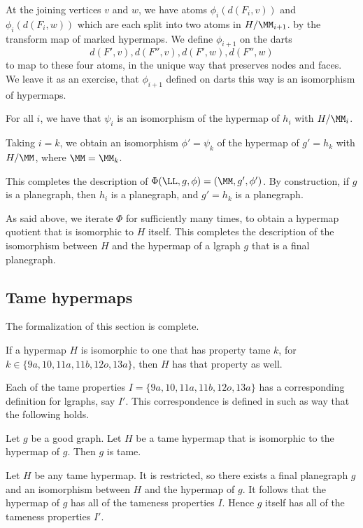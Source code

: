 \begin{lemma}
\begin{lemma}
At the joining vertices $v$ and $w$, we have atoms $\phi_i(d(F_i,v))$
and $\phi_i(d(F_i,w))$ which are each split into two atoms in
$H/\MM_{i+1}$.  by the transform map of marked hypermaps.  We define
$\phi_{i+1}$ on the darts
\[
d(F',v), d(F'',v), d(F',w), d(F'',w)
\]
to map to these four atoms, in the unique way that preserves nodes and
faces.  We leave it as an exercise, that $\phi_{i+1}$ defined on darts
this way is an isomorphism of hypermaps.

\begin{lemma} For all $i$, we have that 
$\psi_{i}$ is an isomorphism of the hypermap
of $h_{i}$  with $H/\MM_i$.
\end{lemma} 

Taking $i=k$, we obtain an isomorphism $\phi'=\psi_k$ of
the hypermap of $g'=h_k$ with $H/\MM$, where $\MM=\MM_k$.

This completes the description of $\Phi(\LL,g,\phi) = (\MM,g',\phi')$.
By construction, if $g$ is a planegraph, then $h_i$ is a planegraph,
and $g' = h_k$ is a planegraph.

As said above, we iterate $\Phi$ for sufficiently many times, to obtain a
hypermap quotient that is isomorphic to $H$ itself.
This completes the description of the isomorphism between
$H$ and the hypermap of a  lgraph $g$ that is a final planegraph.

\subsection{Tame hypermaps}

The formalization of this section is complete.

\begin{lemma} 
If a hypermap $H$ is isomorphic to one that has property
tame $k$, for $k\in \{9a, 10, 11a, 11b, 12o, 13a\}$, then
$H$ has that property as well.
\end{lemma} 

Each of the tame properties $I=\{9a,10,11a,11b,12o,13a\}$ has
a corresponding definition for lgraphs, say $I'$.  This correspondence is
defined in such as way that the following holds.

\begin{lemma}  Let $g$ be a good graph.  
Let $H$ be a tame hypermap that is isomorphic to the hypermap of $g$.
Then $g$ is tame.
\end{lemma} 

Let $H$ be any tame hypermap.  It is restricted, so there exists
a final planegraph $g$ and an isomorphism between $H$ and the
hypermap of $g$.  It follows that the hypermap of $g$ has all of
the tameness properties $I$.  Hence $g$ itself has all of the tameness
properties $I'$.  


\end{lemma}
\end{lemma}
